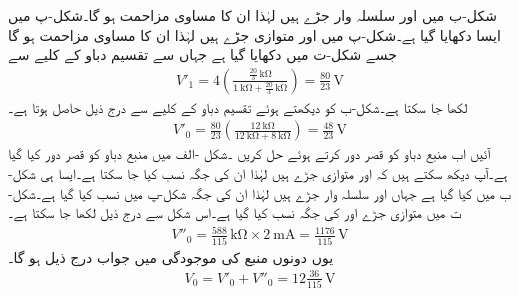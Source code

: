 شکل-ب میں  اور  سلسلہ وار جڑے ہیں لہٰذا ان کا مساوی مزاحمت  ہو گا۔شکل-پ میں ایسا دکھایا گیا ہے۔شکل-پ میں  اور  متوازی جڑے ہیں لہٰذا ان کا مساوی مزاحمت
  ہو گا جسے شکل-ت میں دکھایا گیا ہے جہاں سے تقسیم دباو کے کلیے سے
\begin{align*}
V'_1=4\left(\frac{\frac{20}{3} \, \si{\kilo\ohm}}{\SI{1}{\kilo\ohm}+\frac{20}{3} \, \si{\kilo\ohm}}\right) =\frac{80}{23}\,\si{\volt}
\end{align*}
لکھا جا سکتا ہے۔شکل-ب کو دیکھتے ہوئے تقسیم دباو کے کلیے سے درج ذیل حاصل ہوتا ہے۔
\begin{align*}
V'_0=\frac{80}{23}\left(\frac{\SI{12}{\kilo\ohm}}{\SI{12}{\kilo\ohm}+\SI{8}{\kilo\ohm}}\right)=\frac{48}{23}\, \si{\volt}
\end{align*}
آئیں اب منبع دباو کو قصر دور کرتے ہوئے حل کریں ۔شکل -الف  میں منبع دباو کو قصر دور کیا گیا ہے۔آپ دیکھ سکتے ہیں کہ  اور  متوازی جڑے ہیں لہٰذا ان کی جگہ  نسب کیا جا سکتا ہے۔ایسا ہی شکل-ب میں کیا گیا ہے جہاں  اور  سلسلہ وار جڑے ہیں لہٰذا ان کی جگہ شکل-پ میں  نسب کیا گیا ہے۔شکل-ت میں متوازی جڑے  اور  کی جگہ  نسب کیا گیا ہے۔اس شکل سے درج ذیل لکھا جا سکتا ہے۔
\begin{align*}
V''_0=\frac{588}{115} \, \si{\kilo\ohm} \times \SI{2}{\milli\ampere}=\frac{1176}{115}\, \si{\volt}
\end{align*}
یوں دونوں منبع کی موجودگی میں جواب درج ذیل ہو گا۔
\begin{align*}
V_0=V'_0+V''_0=12\frac{36}{115}\,\si{\volt}
\end{align*}

